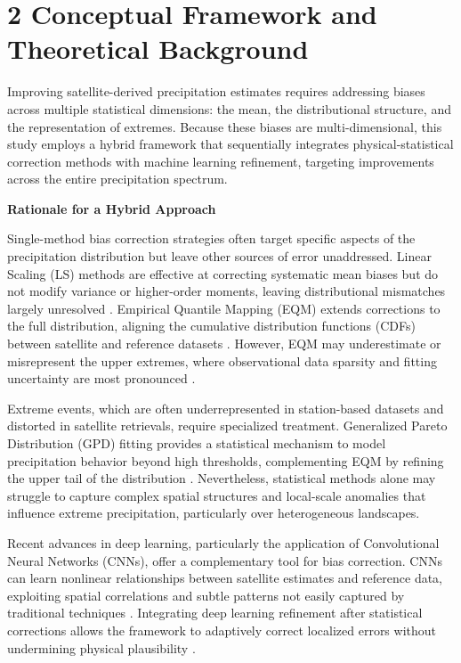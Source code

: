 \documentclass[
]{article}
\begin{document}
\section{2 Conceptual Framework and Theoretical Background}

Improving satellite-derived precipitation estimates requires addressing
biases across multiple statistical dimensions: the mean, the
distributional structure, and the representation of extremes. Because
these biases are multi-dimensional, this study employs a hybrid
framework that sequentially integrates physical-statistical correction
methods with machine learning refinement, targeting improvements across
the entire precipitation spectrum.

\textbf{Rationale for a Hybrid Approach}

Single-method bias correction strategies often target specific aspects
of the precipitation distribution but leave other sources of error
unaddressed. Linear Scaling (LS) methods are effective at correcting
systematic mean biases but do not modify variance or higher-order
moments, leaving distributional mismatches largely unresolved
\cite{ref4,ref16}. Empirical Quantile Mapping (EQM) extends corrections to the
full distribution, aligning the cumulative distribution functions (CDFs)
between satellite and reference datasets \cite{ref5,ref6}. However, EQM may
underestimate or misrepresent the upper extremes, where observational
data sparsity and fitting uncertainty are most pronounced \cite{ref8}.

Extreme events, which are often underrepresented in station-based
datasets and distorted in satellite retrievals, require specialized
treatment. Generalized Pareto Distribution (GPD) fitting provides a
statistical mechanism to model precipitation behavior beyond high
thresholds, complementing EQM by refining the upper tail of the
distribution \cite{ref7}. Nevertheless, statistical methods alone may
struggle to capture complex spatial structures and local-scale anomalies
that influence extreme precipitation, particularly over heterogeneous
landscapes.

Recent advances in deep learning, particularly the application of
Convolutional Neural Networks (CNNs), offer a complementary tool for
bias correction. CNNs can learn nonlinear relationships between
satellite estimates and reference data, exploiting spatial correlations
and subtle patterns not easily captured by traditional techniques
\cite{ref9,ref17}. Integrating deep learning refinement after statistical
corrections allows the framework to adaptively correct localized errors
without undermining physical plausibility \cite{ref10}.
\end{document}
